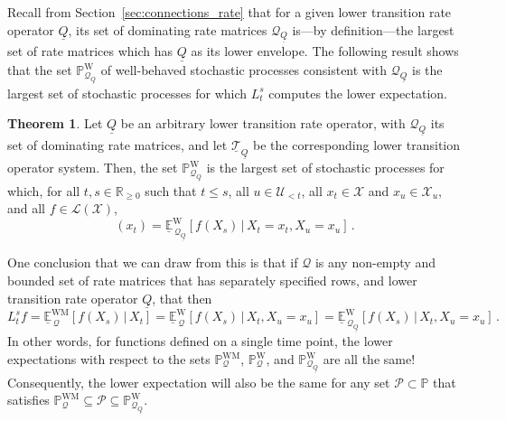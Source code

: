 \documentclass[10pt,a4paper]{paper}
\theoremstyle{definition}
\newtheorem{theorem}{Theorem}[section]
\newcommand{\reals}{\mathbb{R}}
\newcommand{\realsnonneg}{\reals_{\geq 0}}
\newcommand{\states}{\mathcal{X}}
\newcommand{\processes}{\mathbb{P}}
\newcommand{\mprocesses}{\processes^{\mathrm{M}}}
\newcommand{\wprocesses}{\processes^{\mathrm{W}}}
\newcommand{\wmprocesses}{\processes^{\mathrm{WM}}}
\newcommand{\gambles}{\mathcal{L}}
\newcommand{\gamblesX}{\gambles(\states)}
\newcommand{\rateset}{\mathcal{Q}}
\newcommand{\lrate}{\underline{Q}}
\begin{document}
%
%

Recall from Section~\ref{sec:connections_rate} that for a given lower transition rate operator $\lrate$, its set of dominating rate matrices $\rateset_{\lrate}$ is---by definition---the largest set of rate matrices which has $\lrate$ as its lower envelope. The following result shows that the set $\wprocesses_{\rateset_{\lrate}}$ of well-behaved stochastic processes consistent with $\rateset_{\lrate}$ is the largest set of stochastic processes for which $L_t^s$ computes the lower expectation.

\begin{theorem}\label{theo:dominating_rate_processes_max_set}
Let $\lrate$ be an arbitrary lower transition rate operator, with $\rateset_{\lrate}$ its set of dominating rate matrices, and let  $\underline{\mathcal{T}}_{\lrate}$ be the corresponding lower transition operator system. Then, the set $\wprocesses_{\rateset_{\lrate}}$ is the largest set of stochastic processes for which, for all $t,s\in\realsnonneg$ such that $t\leq s$, all $u\in\mathcal{U}_{<t}$, all $x_t\in\states$ and $x_u\in\states_u$, and all $f\in\gamblesX$,
\begin{equation*}
[L_t^sf](x_t) = \underline{\mathbb{E}}_{\,\rateset_{\lrate}}^{\mathrm{W}}[f(X_s)\,\vert\,X_t=x_t,X_u=x_u]\,.
\end{equation*}
\end{theorem}

One conclusion that we can draw from this is that if $\rateset$ is any non-empty and bounded set of rate matrices that has separately specified rows, and lower transition rate operator $\lrate$, that then
\begin{equation*}
L_{t}^sf = \underline{\mathbb{E}}_{\,\rateset}^{\mathrm{WM}}[f(X_s)\,\vert\,X_{t}] = \underline{\mathbb{E}}_{\,\rateset}^{\mathrm{W}}[f(X_s)\,\vert\,X_t,X_u=x_u] = \underline{\mathbb{E}}_{\,\rateset_{\lrate}}^{\mathrm{W}}[f(X_s)\,\vert\,X_t,X_u=x_u]\,.
\end{equation*}
In other words, for functions defined on a single time point, the lower expectations with respect to the sets $\wmprocesses_{\rateset}$, $\wprocesses_{\rateset}$, and $\wprocesses_{\rateset_{\lrate}}$ are all the same! Consequently, the lower expectation will also be the same for any set $\mathcal{P}\subset\processes$ that satisfies $\wmprocesses_\rateset \subseteq \mathcal{P} \subseteq \wprocesses_{\rateset_{\lrate}}$.
\end{document}
